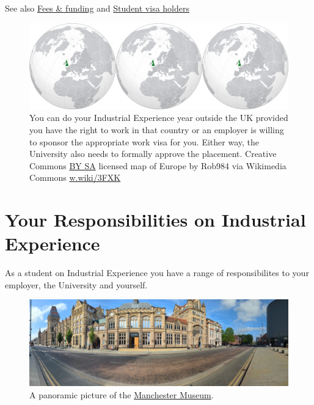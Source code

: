 \documentclass[
]{book}
\begin{document}
See also \href{https://www.manchester.ac.uk/study/undergraduate/fees-and-funding/}{Fees \& funding} and \href{https://www.studentsupport.manchester.ac.uk/immigration-and-visas/}{Student visa holders}

\begin{figure}

{\centering \includegraphics[width=40in]{images/letsgooutside} 

}

\caption{You can do your Industrial Experience year outside the UK provided you have the right to work in that country or an employer is willing to sponsor the appropriate work visa for you. Either way, the University also needs to formally approve the placement. Creative Commons \href{https://creativecommons.org/licenses/by-sa/4.0/deed.en}{BY SA} licensed map of Europe by Rob984 via Wikimedia Commons \href{https://w.wiki/3FXK}{w.wiki/3FXK}}\label{fig:notuk-fig}
\end{figure}



\chapter{Your Responsibilities on Industrial Experience}\label{you}

As a student on Industrial Experience you have a range of responsibilites to your employer, the University and yourself.

\begin{figure}

{\centering \includegraphics[width=1\linewidth]{images/mancmuseum} 

}

\caption{A panoramic picture of the \href{https://en.wikipedia.org/wiki/Manchester_Museum}{Manchester Museum}.}\label{fig:resp-fig}
\end{figure}
\end{document}
